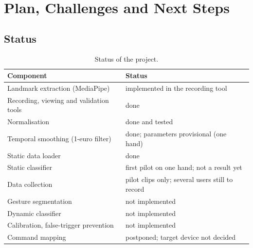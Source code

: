 \section{Plan, Challenges and Next Steps}
\label{sec:plan}

\subsection{Status}
\begin{table}[h]
\centering
\begin{tabular}{@{}lp{9.5cm}@{}}
\toprule
Component & Status \\
\midrule
Landmark extraction (MediaPipe) & implemented in the recording tool \\
Recording, viewing and validation tools & done \\
Normalisation & done and tested \\
Temporal smoothing (1-euro filter) & done; parameters provisional (one hand) \\
Static data loader & done \\
Static classifier & first pilot on one hand; not a result yet \\
Data collection & pilot clips only; several users still to record \\
Gesture segmentation & not implemented \\
Dynamic classifier & not implemented \\
Calibration, false-trigger prevention & not implemented \\
Command mapping & postponed; target device not decided \\
\bottomrule
\end{tabular}
\caption{Status of the project. }
\end{table}

